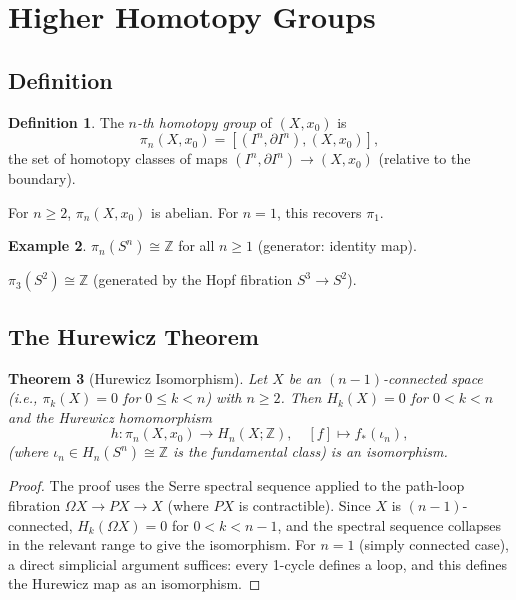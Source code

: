 \documentclass[12pt,a4paper]{amsart}
\newtheorem{theorem}{Theorem}[section]
\theoremstyle{definition}
\newtheorem{definition}[theorem]{Definition}
\newtheorem{example}[theorem]{Example}
\begin{document}
\section{Higher Homotopy Groups}
\label{sec:higher}

\subsection{Definition}

\begin{definition}
The \emph{$n$-th homotopy group} of $(X, x_0)$ is
\[
  \pi_n(X, x_0) = [(I^n, \partial I^n), (X, x_0)],
\]
the set of homotopy classes of maps $(I^n, \partial I^n) \to (X, x_0)$
(relative to the boundary).
\end{definition}

For $n \geq 2$, $\pi_n(X, x_0)$ is abelian. For $n = 1$, this recovers $\pi_1$.

\begin{example}
$\pi_n(S^n) \cong \mathbb{Z}$ for all $n \geq 1$ (generator: identity map).

$\pi_3(S^2) \cong \mathbb{Z}$ (generated by the Hopf fibration $S^3 \to S^2$).
\end{example}

\subsection{The Hurewicz Theorem}

\begin{theorem}[Hurewicz Isomorphism]
\label{thm:hurewicz}
Let $X$ be an $(n-1)$-connected space (i.e., $\pi_k(X) = 0$ for $0 \leq k < n$)
with $n \geq 2$. Then $H_k(X) = 0$ for $0 < k < n$ and the
\emph{Hurewicz homomorphism}
\[
  h\colon \pi_n(X, x_0) \to H_n(X;\mathbb{Z}),
  \quad [f] \mapsto f_*(\iota_n),
\]
(where $\iota_n \in H_n(S^n) \cong \mathbb{Z}$ is the fundamental class)
is an isomorphism.
\end{theorem}
\begin{proof}
The proof uses the Serre spectral sequence applied to the path-loop fibration
$\Omega X \to PX \to X$ (where $PX$ is contractible). Since $X$ is $(n-1)$-connected,
$H_k(\Omega X) = 0$ for $0 < k < n-1$, and the spectral sequence collapses in
the relevant range to give the isomorphism. For $n=1$ (simply connected case),
a direct simplicial argument suffices: every 1-cycle defines a loop, and this
defines the Hurewicz map as an isomorphism.
\end{proof}
\end{document}
